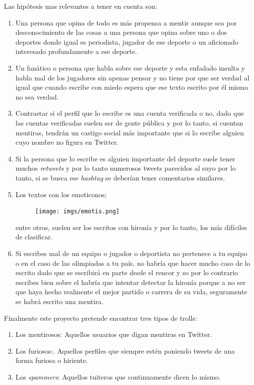 \documentclass[../all.tex]{subfiles}
\begin{document}
		Las hipótesis mas relevantes a tener en cuenta son:
		\begin{enumerate}
			\item Una persona que opina de todo es más propensa a mentir aunque sea por desconocimiento de las cosas a una persona que opina sobre uno o dos deportes donde igual es periodista, jugador de ese deporte o un aficionado interesado profundamente a ese deporte.
			\item Un fanático o persona que habla sobre ese deporte y esta enfadado insulta y habla mal de los jugadores sin apenas pensar y no tiene por que ser verdad al igual que cuando escribe con miedo espera que ese texto escrito por él mismo no sea verdad.
			\item  Contrastar si el perfil que lo escribe es una cuenta verificada o no, dado que las cuentas verificadas suelen ser de gente pública y por lo tanto, si cuentan mentiras, tendrán un castigo social más importante que si lo escribe alguien cuyo nombre no figura en Twitter. 
			\item Si la persona que lo escribe es alguien importante del deporte suele tener muchos \textit{retweets} y por lo tanto numerosos tweets parecidos al suyo por lo tanto, si se busca ese \textit{hashtag} se deberían tener comentarios similares.
			\newpage
			\item Los textos con los emoticonos;
			\begin{figure}[H]
				\centering
				\texttt{[image: imgs/emotis.png]}
			\end{figure}
			entre otros, suelen ser los escritos con hironía y por lo tanto, los más difíciles de clasificar.
			\item Si escribes mal de un equipo o jugador o deportista no pertenece a tu equipo o en el caso de las olimpiadas a tu país, no habría que hacer mucho caso de lo escrito dado que se escribirá en parte desde el rencor y so por lo contrario escribes bien sobre el habría que intentar detectar la hironía porque a no ser que haya hecho realmente el mejor partido o carrera de su vida, seguramente se habrá escrito una mentira.
		\end{enumerate}
	
	Finalmente este proyecto  pretende encontrar tres tipos de trolls:
	\begin{enumerate}
		\item Los mentirosos: Aquellos usuarios que digan mentiras en Twitter.
		\item Los furiosos:. Aquellos perfiles que siempre estén poniendo tweets de una forma furiosa o hiriente.
		\item Los \textit{spammers}: Aquellos tuiteros que continuamente dicen lo mismo.
	\end{enumerate}

		 
\end{document}
